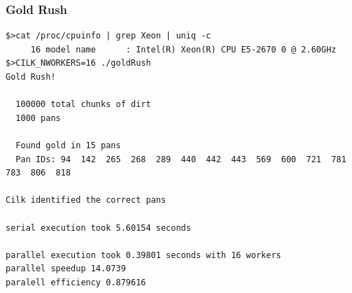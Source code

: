 \documentclass[fleqn,xcolor=table,10pt,final]{beamer}
\begin{document}
\begin{frame}[fragile]
  \frametitle{Gold Rush}
  {\scriptsize
  \begin{verbatim}
$>cat /proc/cpuinfo | grep Xeon | uniq -c
     16 model name      : Intel(R) Xeon(R) CPU E5-2670 0 @ 2.60GHz
$>CILK_NWORKERS=16 ./goldRush
Gold Rush!

  100000 total chunks of dirt
  1000 pans

  Found gold in 15 pans
  Pan IDs: 94  142  265  268  289  440  442  443  569  600  721  781  783  806  818

Cilk identified the correct pans

serial execution took 5.60154 seconds

parallel execution took 0.39801 seconds with 16 workers
parallel speedup 14.0739
paralell efficiency 0.879616
  \end{verbatim}
}
\end{frame}
\end{document}
